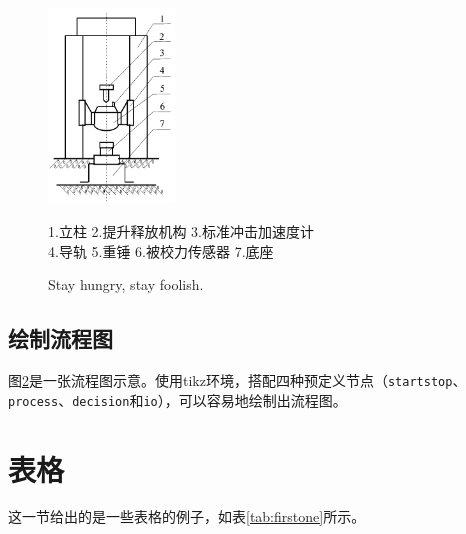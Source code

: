 \documentclass[doctor,openright,twoside]{sjtuthesis}
\theoremstyle{plain}
\theoremstyle{definition}
\theoremstyle{remark}
\theoremstyle{ocrenumbox}
\theoremstyle{plain}
\begin{document}
\begin{figure}[!htp]
  \centering
  \includegraphics[width=0.3\textwidth]{example/cn_100t.png}\
  \begin{center}
    \small\kaishu 1.立柱 2.提升释放机构 3.标准冲击加速度计 \\ 4.导轨 5.重锤 6.被校力传感器 7.底座
  \end{center}
  \vspace{-1em}
    {Stay hungry, stay foolish.}
 \label{fig:cn_100t}
\end{figure}

\subsection{绘制流程图}

图\ref{fig:flow_chart}是一张流程图示意。使用tikz环境，搭配四种预定义节点（\verb+startstop+、\verb+process+、\verb+decision+和\verb+io+），可以容易地绘制出流程图。

\begin{figure}[!htp]
    \centering
    \resizebox{6cm}{!}{}
    \label{fig:flow_chart}
\end{figure}

\clearpage

\section{表格}
\label{sec:tab}

这一节给出的是一些表格的例子，如表\ref{tab:firstone}所示。
\end{document}
